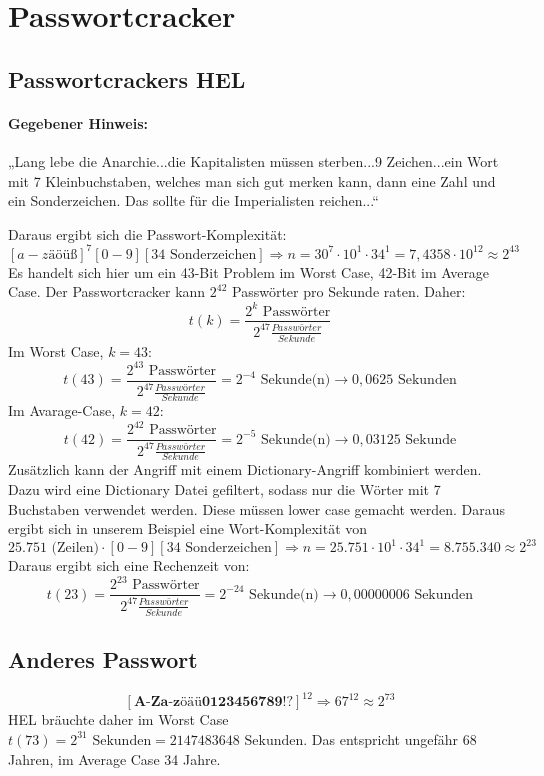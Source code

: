\section{Passwortcracker}
\subsection{Passwortcrackers HEL}
\paragraph{Gegebener Hinweis:} „Lang lebe die Anarchie...die Kapitalisten müssen sterben...9 Zeichen...ein Wort mit 7 Kleinbuchstaben, welches man sich gut merken kann, dann eine Zahl und ein Sonderzeichen. Das sollte für die Imperialisten reichen...“

Daraus ergibt sich die Passwort-Komplexität:
$$
[a-zäöüß]^7[0-9][\text{34 Sonderzeichen}]
\Rightarrow 
n = 30^7 \cdot 10^1 \cdot 34^1 
= 7,4358 \cdot 10^{12}
\approx 2^{43}                                                                                                                                   
$$
Es handelt sich hier um ein 43-Bit Problem im Worst Case, 42-Bit im Average Case. Der Passwortcracker kann $2^{42}$ Passwörter pro Sekunde raten. Daher:
$$
t(k)=
\frac{
2^{k} \text{ Passwörter}
}{
2^{47} \frac{Passwörter}{Sekunde}
}
$$
Im Worst Case, $k=43$:
$$
t(43)
= \frac{
2^{43} \text{ Passwörter}
}{
2^{47} \frac{Passwörter}{Sekunde}
}
= 2^{-4} \text{ Sekunde(n)}
\rightarrow 0,0625 \text{ Sekunden}
$$ Im Avarage-Case, $k=42$:
$$
t(42)
= \frac{
2^{42} \text{ Passwörter}
}{
2^{47} \frac{Passwörter}{Sekunde}
}
= 2^{-5} \text{ Sekunde(n)}
\rightarrow 0,03125 \text{ Sekunde}
$$
Zusätzlich kann der Angriff mit einem Dictionary-Angriff kombiniert werden. Dazu wird eine Dictionary Datei gefiltert, sodass nur die Wörter mit 7 Buchstaben verwendet werden. Diese müssen lower case gemacht werden. Daraus ergibt sich in unserem Beispiel eine Wort-Komplexität von
$$
25.751 \text{ (Zeilen)} \cdot  [0-9][\text{34 Sonderzeichen}]
\Rightarrow
n = 25.751 \cdot 10^1 \cdot 34^1
= 8.755.340
\approx 2^{23}                                                                                                                                   
$$
Daraus ergibt sich eine Rechenzeit von:
$$
t(23)
= \frac{
2^{23} \text{ Passwörter}
}{
2^{47} \frac{Passwörter}{Sekunde}
}
= 2^{-24} \text{ Sekunde(n)}
\rightarrow 0,00000006 \text{ Sekunden}
$$ \subsection{Anderes Passwort}
$$
[\textbf{A-Za-zöäü0123456789!?}]^{12} \Rightarrow 67^{12} \approx 2^{73}
$$
HEL bräuchte daher im Worst Case $
t(73)= 2^{31} \text{ Sekunden} = 2147483648 \text{ Sekunden}
$. Das entspricht ungefähr 68 Jahren, im Average Case 34 Jahre.


